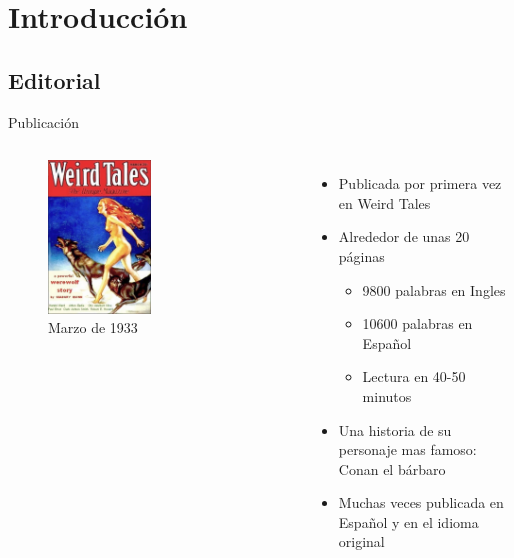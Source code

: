 \section{Introducción}
\subsection{Editorial}
\begin{frame}{Publicación}
\begin{columns}
    \begin{figure}[htb]
    \centering
        \includegraphics[width=0.5\textwidth]{img/WeirdTales-1933-03}
        \caption{Marzo de 1933}
    \end{figure}    
    \begin{itemize}
         \item Publicada por primera vez en Weird Tales
         \item Alrededor de unas 20 páginas
         \begin{itemize}
            \item 9800 palabras en Ingles
            \item 10600 palabras en Español
            \item Lectura en 40-50 minutos
         \end{itemize}
         \item Una historia de su personaje mas famoso: Conan el bárbaro
         \item Muchas veces publicada en Español y en el idioma original
    \end{itemize}
\end{columns}
\end{frame}


